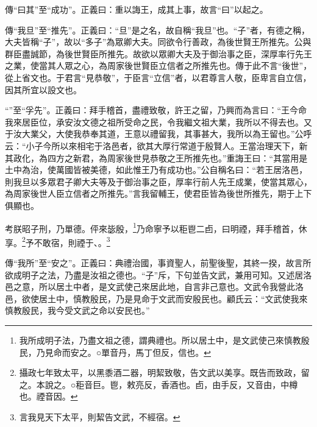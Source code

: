{\noindent\zhuan{}\fzbyks 傳“曰其”至“成功”。正義曰：重以誨王，成其上事，故言“曰”以起之。 \par}

{\noindent\zhuan{}\fzbyks 傳“我旦”至“推先”。正義曰：“旦”是之名，故自稱“我旦”也。“子”者，有德之稱，大夫皆稱“子”，故以“多子”為眾卿大夫。同欲令行善政，為後世賢王所推先。公與群臣盡誠節，為後世賢臣所推先。故欲以眾卿大夫及于御治事之臣，深厚率行先王之業，使當其人眾之心，為周家後世賢臣立信者之所推先也。傳于此不言“後世”，從上省文也。于君言“見恭敬”，于臣言“立信”者，以君尊言人敬，臣卑言自立信，因其所宜以設文也。 \par}

{\noindent\shu{}\fzkt “”至“孚先”。正義曰：拜手稽首，盡禮致敬，許王之留，乃興而為言曰：“王今命我來居臣位，承安汝文德之祖所受命之民，令我繼文祖大業，我所以不得去也。又于汝大業父，大使我恭奉其道，王意以禮留我，其事甚大，我所以為王留也。”公呼云：“小子今所以來相宅于洛邑者，欲其大厚行常道于殷賢人。王當治理天下，新其政化，為四方之新君，為周家後世見恭敬之王所推先也。”重誨王曰：“其當用是土中為治，使萬國皆被美德，如此惟王乃有成功也。”公自稱名曰：“若王居洛邑，則我旦以多眾君子卿大夫等及于御治事之臣，厚率行前人先王成業，使當其眾心，為周家後世人臣立信者之所推先。”言我留輔王，使君臣皆為後世所推先，期于上下俱顯也。 \par}

考朕昭子刑，乃單德。伻來毖殷，\footnote{我所成明子法，乃盡文祖之德，謂典禮也。所以居土中，是文武使己來慎教殷民，乃見命而安之。○單音丹，馬丁但反，信也。}乃命寧予以秬鬯二卣，曰明禋，拜手稽首，休享。\footnote{攝政七年致太平，以黑黍酒二器，明絜致敬，告文武以美享。既告而致政，留之。本說之。○秬音巨。鬯，敕亮反，香酒也。卣，由手反，又音由，中樽也。禋音因。}予不敢宿，則禋于、。\footnote{言我見天下太平，則絜告文武，不經宿。}


{\noindent\zhuan{}\fzbyks 傳“我所”至“安之”。正義曰：典禮治國，事資聖人，前聖後聖，其終一揆，故言所欲成明子之法，乃盡是汝祖之德也。“子”斥，下句並告文武，兼用可知。又述居洛邑之意，所以居土中者，是文武使己來居此地，自言非己意也。文武令我營此洛邑，欲使居土中，慎教殷民，乃是見命于文武而安殷民也。顧氏云：“文武使我來慎教殷民，我今受文武之命以安民也。” \par}

